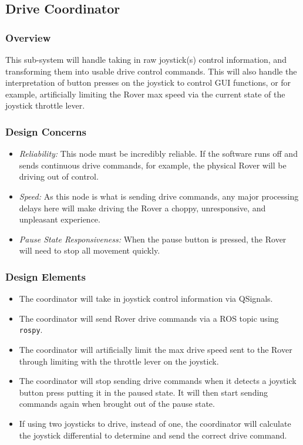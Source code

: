 \subsection{Drive Coordinator}
\subsubsection{Overview}
This sub-system will handle taking in raw joystick(s) control information, and transforming them into usable drive control commands.
This will also handle the interpretation of button presses on the joystick to control GUI functions, or for example, artificially limiting the Rover max speed via the current state of the joystick throttle lever.

\subsubsection{Design Concerns}
\begin{itemize}
\item \textit{Reliability:} This node must be incredibly reliable.
If the software runs off and sends continuous drive commands, for example, the physical Rover will be driving out of control.
\item \textit{Speed:} As this node is what is sending drive commands, any major processing delays here will make driving the Rover a choppy, unresponsive, and unpleasant experience.
\item \textit{Pause State Responsiveness:} When the pause button is pressed, the Rover will need to stop all movement quickly.
\end{itemize}

\subsubsection{Design Elements}
\begin{itemize}
\item The coordinator will take in joystick control information via QSignals.
\item The coordinator will send Rover drive commands via a ROS topic using \texttt{rospy}.
\item The coordinator will artificially limit the max drive speed sent to the Rover through limiting with the throttle lever on the joystick.
\item The coordinator will stop sending drive commands when it detects a joystick button press putting it in the paused state.
It will then start sending commands again when brought out of the pause state.
\item If using two joysticks to drive, instead of one, the coordinator will calculate the joystick differential to determine and send the correct drive command. 
\end{itemize}

